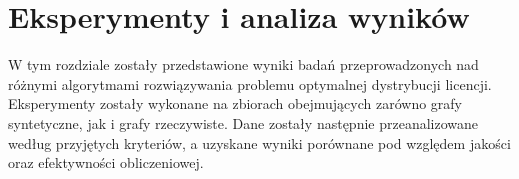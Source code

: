 \chapter{Eksperymenty i analiza wyników}

W tym rozdziale zostały przedstawione wyniki badań przeprowadzonych nad różnymi algorytmami rozwiązywania problemu optymalnej dystrybucji licencji. Eksperymenty zostały wykonane na zbiorach obejmujących zarówno grafy syntetyczne, jak i grafy rzeczywiste. Dane zostały następnie przeanalizowane według przyjętych kryteriów, a uzyskane wyniki porównane pod względem jakości oraz efektywności obliczeniowej.




